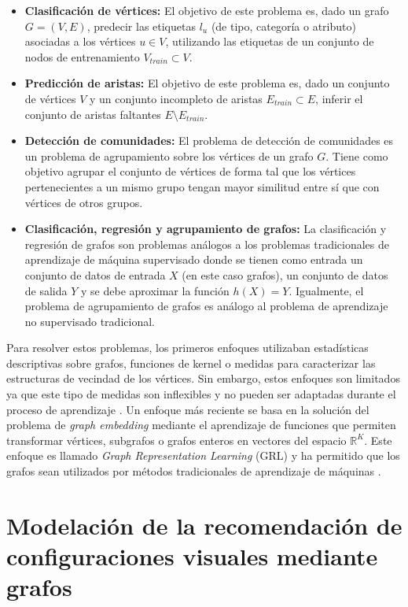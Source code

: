 \begin{itemize}
    \item \textbf{Clasificaci\'on de v\'ertices: } El objetivo de este problema es, dado un grafo $G = (V,E)$,
    predecir las etiquetas $l_u$ (de tipo, categor\'ia o atributo) asociadas
    a los v\'ertices $u \in V$, utilizando las etiquetas de un conjunto de nodos de entrenamiento $V_{train} \subset V$.
    \item \textbf{Predicci\'on de aristas: } El objetivo de este problema es, dado un conjunto de
    v\'ertices $V$ y un conjunto incompleto de aristas $E_{train} \subset E$, inferir el conjunto
    de aristas faltantes $ E \setminus E_{train}$.
    \item \textbf{Detecci\'on de comunidades: } El problema de detecci\'on de comunidades es un problema de agrupamiento
    sobre los v\'ertices de un grafo $G$. Tiene como objetivo
    agrupar el conjunto de v\'ertices de forma tal que los v\'ertices pertenecientes
    a un mismo grupo tengan mayor similitud entre s\'i que con v\'ertices de otros grupos.
    \item \textbf{Clasificaci\'on, regresi\'on y agrupamiento de grafos: } La clasificaci\'on y regresi\'on de grafos son problemas
    an\'alogos a los problemas tradicionales de aprendizaje de m\'aquina supervisado donde se tienen como entrada un conjunto de
    datos de entrada $X$ (en este caso grafos), un conjunto de datos de salida $Y$ y se debe aproximar la funci\'on $h(X) = Y$. Igualmente,
    el problema de agrupamiento de grafos es an\'alogo al problema de aprendizaje no supervisado tradicional. 
\end{itemize}

Para resolver estos problemas, los primeros enfoques utilizaban estad\'isticas
descriptivas sobre grafos, funciones de kernel o medidas para caracterizar las
estructuras de vecindad de los v\'ertices. Sin embargo, estos enfoques son limitados ya que este tipo de medidas son inflexibles y no pueden ser adaptadas durante el proceso
de aprendizaje \cite{chakrabarti2006graph}. Un enfoque m\'as reciente
se basa en la soluci\'on del problema de \textit{graph embedding} mediante el aprendizaje
de funciones que permiten transformar v\'ertices, subgrafos o grafos enteros en
vectores del espacio $\mathbb{R}^K$. Este enfoque es
llamado \textit{Graph Representation Learning} (GRL) y ha permitido que
los grafos sean utilizados por m\'etodos tradicionales de aprendizaje de m\'aquinas \cite{hamilton2017representation}.


\section{Modelaci\'on de la recomendaci\'on de configuraciones visuales mediante grafos}\label{section:graph-framework}


